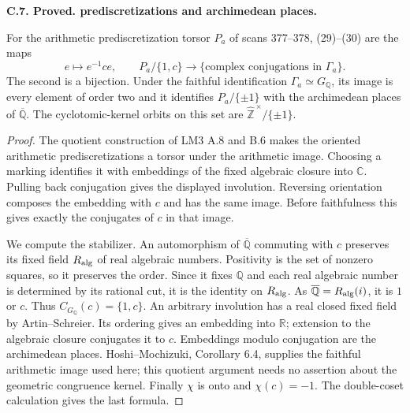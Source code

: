 \documentclass[11pt,oneside]{article}
\makeatletter
\newcounter{statementanchor}
\newenvironment{statement}[3]{%
 \refstepcounter{statementanchor}\def\@currentlabel{#1}%
 \par\addvspace{9pt}\noindent
 \textbf{#1. #2. #3.}\par\nobreak\noindent\ignorespaces
}{\par\addvspace{5pt}}
\makeatother
\begin{document}
\begin{statement}{C.7}{Proved}{prediscretizations and archimedean places}
\label{st:C.7}
\label{C-prediscretizations}
For the arithmetic prediscretization torsor $P_a$
of scans 377--378, (29)--(30) are the maps
\[
 e\longmapsto e^{-1}ce,\qquad
 P_a/\{1,c\}\longrightarrow
 \{\text{complex conjugations in }\Gamma_a\}.
\]
The second is a bijection. Under the faithful
identification $\Gamma_a\simeq G_{\mathbb Q}$, its
image is every element of order two and it
identifies $P_a/\{\pm1\}$ with the archimedean
places of $\overline{\mathbb Q}$.
The cyclotomic-kernel orbits on this set are
$\widehat{\mathbb Z}^{\,\times}/\{\pm1\}$.
\end{statement}
\begin{proof}
The quotient construction of LM3 A.8 and B.6 makes
the oriented arithmetic prediscretizations a torsor
under the arithmetic image. Choosing a marking
identifies it with embeddings of the fixed algebraic
closure into $\mathbb C$. Pulling back conjugation
gives the displayed involution. Reversing orientation
composes the embedding with $c$ and has the same
image. Before faithfulness this gives exactly the
conjugates of $c$ in that image.

We compute the stabilizer. An automorphism of
$\overline{\mathbb Q}$ commuting with $c$ preserves
its fixed field $R_{\rm alg}$ of real algebraic
numbers. Positivity is the set of nonzero squares,
so it preserves the order. Since it fixes
$\mathbb Q$ and each real algebraic number is
determined by its rational cut, it is the
identity on $R_{\rm alg}$. As
$\overline{\mathbb Q}=R_{\rm alg}(i)$, it is
$1$ or $c$. Thus $C_{G_{\mathbb Q}}(c)=\{1,c\}$.
An arbitrary involution has a real closed fixed
field by Artin--Schreier. Its ordering gives an
embedding into $\mathbb R$; extension to the
algebraic closure conjugates it to $c$.
Embeddings modulo conjugation are the archimedean
places. Hoshi--Mochizuki, Corollary 6.4, supplies
the faithful arithmetic image used here; this
quotient argument needs no assertion about the
geometric congruence kernel.
Finally $\chi$ is onto and $\chi(c)=-1$.
The double-coset calculation gives the last formula.
\end{proof}
\end{document}
